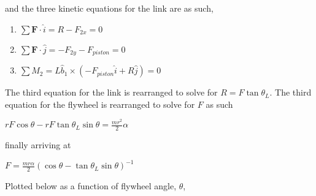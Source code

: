 \documentclass[letterpaper,10pt,english]{sphinxmanual}
\begin{document}
and the three kinetic equations for the link are as such,
\begin{enumerate}
%
\item {} 
\(\sum \mathbf{F}\cdot\hat{i} = R-F_{2x} = 0\)

\item {} 
\(\sum \mathbf{F}\cdot\hat{j} = -F_{2y} - F_{piston} = 0\)

\item {} 
\(\sum M_{2} = L\hat{b}_1 \times (-F_{piston}\hat{i} + R\hat{j}) = 0\)

\end{enumerate}

The third equation for the link is rearranged to solve for \(R =
F\tan\theta_L\). The third equation for the flywheel is rearranged to
solve for \(F\) as such

\(rF\cos\theta -rF\tan\theta_L\sin\theta = \frac{mr^2}{2}\alpha\)

finally arriving at

\(F = \frac{mr\alpha}{2}\left(\cos\theta-\tan\theta_L\sin\theta
\right)^{-1}\)

Plotted below as a function of flywheel angle, \(\theta\),

\begin{sphinxVerbatim}[commandchars=\\\{\}]
  
  
 
\end{sphinxVerbatim}
\end{document}
